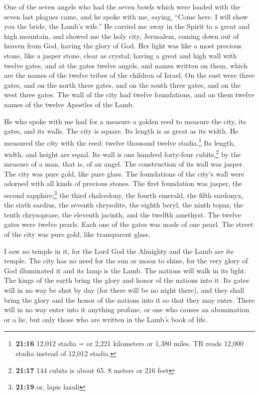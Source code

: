  One of the seven angels who had the seven bowls which
were loaded with the seven last plagues came, and he spoke with me,
saying, ``Come here. I will show you the bride, the Lamb's wife.''
 He carried me away in the Spirit to a great and high
mountain, and showed me the holy city, Jerusalem, coming down out of
heaven from God,  having the glory of God. Her light was
like a most precious stone, like a jasper stone, clear as crystal;
 having a great and high wall with twelve gates, and at
the gates twelve angels, and names written on them, which are the names
of the twelve tribes of the children of Israel.  On the
east were three gates, and on the north three gates, and on the south
three gates, and on the west three gates.  The wall of
the city had twelve foundations, and on them twelve names of the twelve
Apostles of the Lamb.

 He who spoke with me had for a measure a golden reed to
measure the city, its gates, and its walls.  The city is
square. Its length is as great as its width. He measured the city with
the reed: twelve thousand twelve stadia.\footnote{\textbf{21:16} 12,012
  stadia = or 2,221 kilometers or 1,380 miles. TR reads 12,000 stadia
  instead of 12,012 stadia.} Its length, width, and height are equal.
 Its wall is one hundred forty-four cubits,\footnote{\textbf{21:17}
  144 cubits is about 65. 8 meters or 216 feet} by the measure of a man,
that is, of an angel.  The construction of its wall was
jasper. The city was pure gold, like pure glass.  The
foundations of the city's wall were adorned with all kinds of precious
stones. The first foundation was jasper, the second sapphire;\footnote{\textbf{21:19}
  or, lapis lazuli} the third chalcedony, the fourth emerald,
 the fifth sardonyx, the sixth sardius, the seventh
chrysolite, the eighth beryl, the ninth topaz, the tenth chrysoprase,
the eleventh jacinth, and the twelfth amethyst.  The
twelve gates were twelve pearls. Each one of the gates was made of one
pearl. The street of the city was pure gold, like transparent glass.

 I saw no temple in it, for the Lord God the Almighty and
the Lamb are its temple.  The city has no need for the
sun or moon to shine, for the very glory of God illuminated it and its
lamp is the Lamb.  The nations will walk in its light.
The kings of the earth bring the glory and honor of the nations into it.
 Its gates will in no way be shut by day (for there will
be no night there),  and they shall bring the glory and
the honor of the nations into it so that they may enter. 
There will in no way enter into it anything profane, or one who causes
an abomination or a lie, but only those who are written in the Lamb's
book of life.

